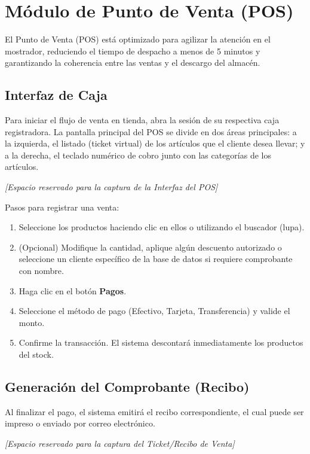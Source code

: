 \section{Módulo de Punto de Venta (POS)}

El Punto de Venta (POS) está optimizado para agilizar la atención en el mostrador, reduciendo el tiempo de despacho a menos de 5 minutos y garantizando la coherencia entre las ventas y el descargo del almacén.

\subsection{Interfaz de Caja}

Para iniciar el flujo de venta en tienda, abra la sesión de su respectiva caja registradora. La pantalla principal del POS se divide en dos áreas principales: a la izquierda, el listado (ticket virtual) de los artículos que el cliente desea llevar; y a la derecha, el teclado numérico de cobro junto con las categorías de los artículos.

\vspace{1cm}
\begin{center}
\textit{[Espacio reservado para la captura de la Interfaz del POS]}
\end{center}
\vspace{1cm}

Pasos para registrar una venta:
\begin{enumerate}
    \item Seleccione los productos haciendo clic en ellos o utilizando el buscador (lupa).
    \item (Opcional) Modifique la cantidad, aplique algún descuento autorizado o seleccione un cliente específico de la base de datos si requiere comprobante con nombre.
    \item Haga clic en el botón \textbf{Pagos}.
    \item Seleccione el método de pago (Efectivo, Tarjeta, Transferencia) y valide el monto.
    \item Confirme la transacción. El sistema descontará inmediatamente los productos del stock.
\end{enumerate}

\subsection{Generación del Comprobante (Recibo)}

Al finalizar el pago, el sistema emitirá el recibo correspondiente, el cual puede ser impreso o enviado por correo electrónico.

\vspace{1cm}
\begin{center}
\textit{[Espacio reservado para la captura del Ticket/Recibo de Venta]}
\end{center}
\vspace{1cm}
